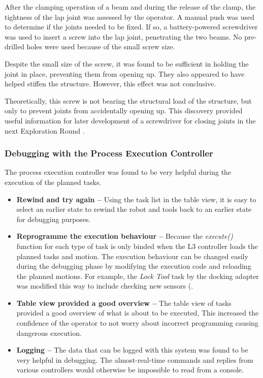After the clamping operation of a beam and during the release of the clamp, the tightness of the lap joint was assessed by the operator. A manual push was used to determine if the joints needed to be fixed. If so, a battery-powered screwdriver was used to insert a screw into the lap joint, penetrating the two beams. No pre-drilled holes were used because of the small screw size. 

Despite the small size of the screw, it was found to be sufficient in holding the joint in place, preventing them from opening up. They also appeared to have helped stiffen the structure. However, this effect was not conclusive.

Theoretically, this screw is not bearing the structural load of the structure, but only to prevent joints from accidentally opening up. This discovery provided useful information for later development of a screwdriver for closing joints in the next Exploration Round . 

\subsubsection{Debugging with the Process Execution Controller}
\label{subsubsection:exploration-3-debugging-with-the-process-execution-controller}

The process execution controller  was found to be very helpful during the execution of the planned tasks. 

\begin{itemize}
	\item \textbf{Rewind and try again --} Using the task list in the table view, it is easy to select an earlier state to rewind the robot and tools back to an earlier state for debugging purposes.

	\item \textbf{Reprogramme the execution behaviour --} Because the \textit{execute() }function for each type of task is only binded when the L3 controller loads the planned tasks and motion. The execution behaviour can be changed easily during the debugging phase by modifying the execution code and reloading the planned motions. For example, the \textit{Lock Tool }task by the docking adapter was modified this way to include checking new sensors (.

	\item \textbf{Table view provided a good overview --} The table view of tasks provided a good overview of what is about to be executed, This increased the confidence of the operator to not worry about incorrect programming causing dangerous execution.

	\item \textbf{Logging --} The data that can be logged with this system was found to be very helpful in debugging. The almost-real-time commands and replies from various controllers would otherwise be impossible to read from a console.

\end{itemize}
